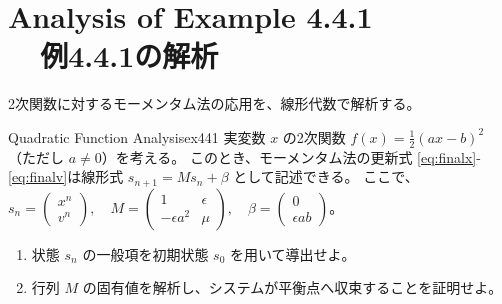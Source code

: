 \documentclass[dvipdfmx,a4paper,11pt]{jsarticle}
\begin{document}
\section{Analysis of Example 4.4.1\\ \quad \ \ 例4.4.1の解析}

2次関数に対するモーメンタム法の応用を、線形代数で解析する。

\begin{reidai}{Quadratic Function Analysis}{ex441}
    実変数 $x$ の2次関数 $f(x) = \frac{1}{2}(ax - b)^2$ （ただし $a \ne 0$）を考える。
    このとき、モーメンタム法の更新式 \eqref{eq:finalx}-\eqref{eq:finalv}は線形式 $s_{n+1} = M s_n + \beta$ として記述できる。
    ここで、$s_n = \begin{pmatrix} x^n \\ v^n \end{pmatrix}, \quad M = \begin{pmatrix} 1 & \epsilon \\ -\epsilon a^2 & \mu \end{pmatrix}, \quad \beta = \begin{pmatrix} 0 \\ \epsilon ab \end{pmatrix}$。
    \begin{enumerate}
        \item 状態 $s_n$ の一般項を初期状態 $s_0$ を用いて導出せよ。
        \item 行列 $M$ の固有値を解析し、システムが平衡点へ収束することを証明せよ。
    \end{enumerate}
\end{reidai}
\vspace{0.5em}
\end{document}
